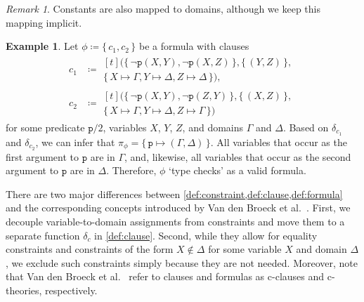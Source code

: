 \documentclass{article}
\theoremstyle{definition}
\newtheorem{example}{Example}
\theoremstyle{remark}
\newtheorem*{remark}{Remark}
\begin{document}
\begin{remark}
  Constants are also mapped to domains, although we keep this mapping implicit.
\end{remark}

\begin{example}\label{example:first}
  Let $\phi \coloneqq \{\, c_1, c_2 \,\}$ be a formula with clauses
  \begin{align*}
    c_1 &\coloneqq
          \begin{multlined}[t]
            (\{\, \neg \texttt{p}(X, Y), \neg \texttt{p}(X, Z) \,\}, \{\, (Y, Z) \,\}, \\
            \{\, X \mapsto \Gamma, Y \mapsto \Delta, Z \mapsto \Delta \,\}),
          \end{multlined}\\
    c_2 &\coloneqq
          \begin{multlined}[t]
            (\{\, \neg \texttt{p}(X, Y), \neg \texttt{p}(Z, Y) \,\}, \{\, (X, Z) \,\}, \\
            \{\, X \mapsto \Gamma, Y \mapsto \Delta, Z \mapsto \Gamma \,\})
          \end{multlined}
  \end{align*}
  for some predicate $\texttt{p}/2$, variables $X$, $Y$, $Z$, and domains
  $\Gamma$ and $\Delta$. Based on $\delta_{c_{1}}$ and $\delta_{c_{2}}$, we can
  infer that $\pi_{\phi} = \{\, \texttt{p} \mapsto (\Gamma, \Delta) \,\}$. All
  variables that occur as the first argument to $\texttt{p}$ are in $\Gamma$,
  and, likewise, all variables that occur as the second argument to $\texttt{p}$
  are in $\Delta$. Therefore, $\phi$ `type checks' as a valid formula.
\end{example}

There are two major differences between
\cref{def:constraint,def:clause,def:formula} and the corresponding concepts
introduced by Van den Broeck et al.~.
First, we decouple variable-to-domain assignments from constraints and move them
to a separate function $\delta_{c}$ in \cref{def:clause}. Second, while they
allow for equality constraints and constraints of the form $X \not\in \Delta$
for some variable $X$ and domain $\Delta$, we exclude such constraints simply
because they are not needed. Moreover, note that Van den Broeck et
al.~ refer to clauses and formulas as
c-clauses and c-theories, respectively.
\end{document}
